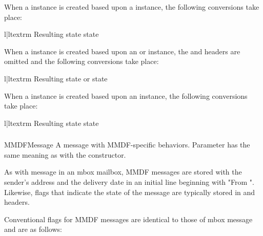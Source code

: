 When a  instance is created based upon a
 instance, the following conversions take place:

\begin{tableii}{l|l}{textrm}
    {Resulting state}{ state}
\end{tableii}

When a  instance is created based upon an
 or  instance, the 
and  headers are omitted and the following conversions
take place:

\begin{tableii}{l|l}{textrm}
    {Resulting state}{ or  state}
\end{tableii}

When a  instance is created based upon an 
instance, the following conversions take place:

\begin{tableii}{l|l}{textrm}
    {Resulting state}{ state}
\end{tableii}

\subsubsection{}
\label{mailbox-mmdfmessage}

\begin{classdesc}{MMDFMessage}{}
A message with MMDF-specific behaviors. Parameter  has the same
meaning as with the  constructor.
\end{classdesc}

As with message in an mbox mailbox, MMDF messages are stored with the sender's
address and the delivery date in an initial line beginning with "From ".
Likewise, flags that indicate the state of the message are typically stored in
 and  headers.

Conventional flags for MMDF messages are identical to those of mbox message and
are as follows:

